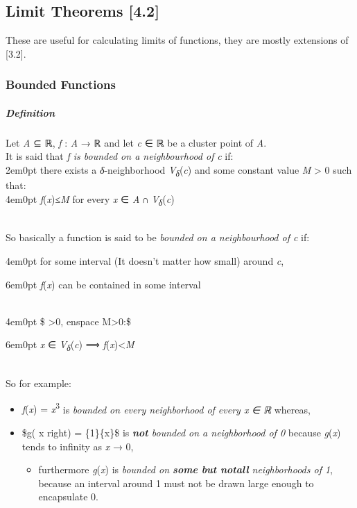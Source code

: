 \documentclass[]{article}
\let\oldsubparagraph\subparagraph
\renewcommand{\subparagraph}[1]{\oldsubparagraph{#1}\mbox{}}
\begin{document}
\subsection{Limit Theorems {[}4.2{]}}\label{limit-theorems-4.2}

These are useful for calculating limits of functions, they are mostly
extensions of {[}3.2{]}.

\subsubsection{Bounded Functions}\label{bounded-functions}

\subparagraph{Definition}\label{definition-1}

Let {\emph{A} ⊆ ℝ}, {\emph{f} : \emph{A} → ℝ} and let {\emph{c} ∈ ℝ} be
a cluster point of {\emph{A}}.\\
It is said that \emph{f is bounded on a neighbourhood of} {\emph{c}}
if:\\

{2em}{0pt} there exists a {\emph{δ}}-neighborhood
{\emph{V}\textsubscript{\emph{δ}}(\emph{c})} and some constant value
{\emph{M} \textgreater{} 0} such that:\\

{4em}{0pt} {\textbar{}\emph{f}(\emph{x})\textbar{}≤\emph{M}} for every
{\emph{x} ∈ \emph{A} ∩ \emph{V}\textsubscript{\emph{δ}}(\emph{c})}

~\\
So basically a function is said to be \emph{bounded on a neighbourhood
of {\emph{c}}} if:

{4em}{0pt} for some interval (It doesn't matter how small) around
{\emph{c}},

{6em}{0pt} {\emph{f}(\emph{x})} can be contained in some interval

~\\

{4em}{0pt} {\$\exists
\delta\textgreater{}0, enspace
\exists M\textgreater{}0:\$}

{6em}{0pt}
{\emph{x} ∈ \emph{V}\textsubscript{\emph{δ}}(\emph{c}) ⟹ \textbar{}\emph{f}(\emph{x})\textbar{}\textless{}\emph{M}}

~\\
So for example:

\begin{itemize}
\item
  {\emph{f}(\emph{x}) = \emph{x}\textsuperscript{3}} is \emph{bounded on
  every neighborhood of every {\emph{x} ∈ ℝ}} whereas,
\item
  {\$g\left( x right) =
  \sfrac\{1\}\{x\}\$} is \emph{\textbf{not} bounded on a
  neighborhood of 0} because {\emph{g}(\emph{x})} tends to infinity as
  {\emph{x} → 0},

  \begin{itemize}
  \item
    {furthermore {\emph{g}(\emph{x})} is \emph{bounded on \textbf{some
    but notall} neighborhoods of 1}, because an interval around 1 must
    not be drawn large enough to encapsulate 0.}
  \end{itemize}
\end{itemize}
\end{document}
